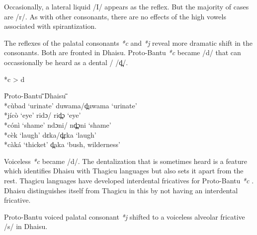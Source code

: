 \documentclass[output=paper,colorlinks,citecolor=brown]{langscibook}
\begin{document}
Occasionally, a lateral liquid /I/ appears as the reflex. But the majority of cases are /r/. As with other consonants, there are no effects of the high vowels associated with spirantization.

The reflexes of the palatal consonants \textit{*c} and \textit{*j} reveal more dramatic shift in the consonants. Both are fronted in Dhaisu. Proto-Bantu \textit{*c} became /d/ that can occassionally be heard as a dental / /d̪/.

\ea%
    \label{ex:ngonyani:9}
    *c > d\\
    \begin{tabbing} 
        \= Proto-Bantu \quad\= \quad\= \quad\= \quad\= \quad\= \quad\= \quad\= Dhaisu \quad\=  \quad\= \quad\= \quad\= \quad\=\\
     
        \> *cùbad
        \> ‘urinate’
        \> \> \>  \> \> \> duwama/d̪uwama
        \> \> \> \> \>  ‘urinate’\\
        
        \> *jícò
        \> ‘eye’
        \> \> \>  \> \> \> ridɔ/ rid̪ɔ
        \> \> \> \> \> ‘eye’\\
        
        \> *cónì
        \> ‘shame’
        \> \> \>  \> \> \> ndɔni/ nd̪̪ɔni
        \> \> \> \> \> ‘shame’\\
        
        \> *cèk
        \> ‘laugh’
        \> \> \>  \> \> \> dɛka/d̪ɛka
        \> \> \> \> \> ‘laugh’\\
        
        \> *càká
        \> ‘thicket’
        \> \> \>  \> \> \> d̪aka
        \> \> \> \> \> ‘bush, wilderness’
    \end{tabbing}
\z

Voiceless \textit{*c} became /d/. The dentalization that is sometimes heard is a feature which identifies Dhaisu with Thagicu languages but also sets it apart from the rest. Thagicu languages have developed interdental fricatives for Proto-Bantu \textit{*c }\citep{Nurse1982}. Dhaisu distinguishes itself from Thagicu in this by not having an interdental fricative. 

Proto-Bantu voiced palatal consonant \textit{*j}  shifted to a voiceless alveolar fricative /s/ in Dhaisu.
\end{document}
